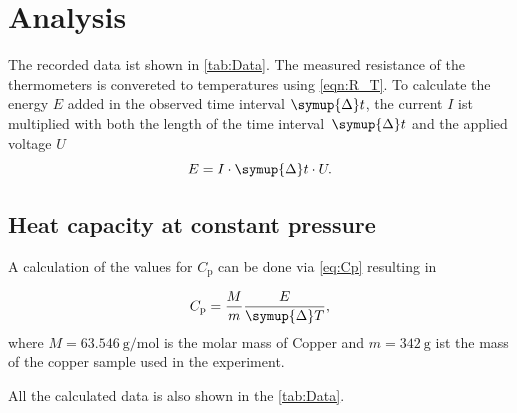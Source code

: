 \section{Analysis}
\label{sec:Analysis}

The recorded data ist shown in \autoref{tab:Data}. The measured resistance of the thermometers is convereted to temperatures using \autoref{eqn:R_T}.
To calculate the energy $E$ added in the observed time interval $\symup{\Delta}t$, the current $I$ ist multiplied with both the length of the time 
interval~$\symup{\Delta}t$ and the applied voltage $U$
\begin{equation}
  E = I \cdot \symup{\Delta}t \cdot U.
  \label{eq:added_E}
\end{equation}

\subsection{Heat capacity at constant pressure}
\label{subsec:Heat capacity at constant volume}
A calculation of the values for $C_\mathrm{p}$ can be done via \autoref{eq:Cp} resulting in

\begin{equation}
  C_\mathrm{p} = \frac{M}{m} \frac{E}{\symup{\Delta}T},
  \label{eq:C_P_calc}
\end{equation}
where $M=\qty{63.546}{\gram\per\mol}$ is the molar mass of Copper and $m=\qty{342}{\gram}$ ist the mass of the copper sample used in the
experiment. 

All the calculated data is also shown in the \autoref{tab:Data}.

